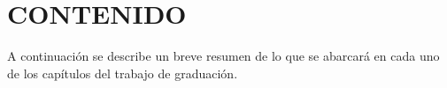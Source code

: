\chapter{CONTENIDO}
A continuación se describe un breve resumen de lo que se abarcará en cada uno de los capítulos del trabajo de graduación.